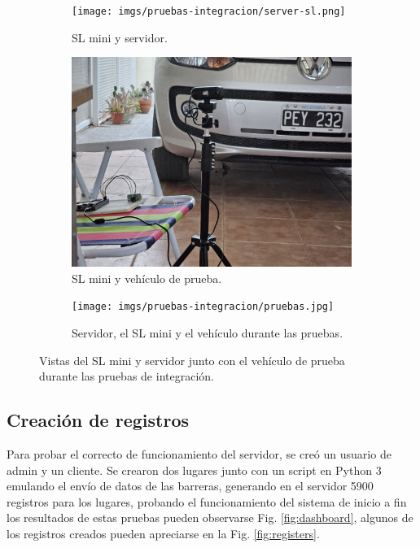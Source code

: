 \begin{figure}
    \centering
    \begin{subfigure}{.3\textwidth}
        \centering
        \texttt{[image: imgs/pruebas-integracion/server-sl.png]}
        \caption{SL mini y servidor.}
    \end{subfigure}
    \begin{subfigure}{.3\textwidth}
        \includegraphics[width=\textwidth]{imgs/pruebas-integracion/sl-auto.jpg}
        \caption{SL mini y vehículo de prueba.}
    \end{subfigure}
    \begin{subfigure}{.3\textwidth}
        \texttt{[image: imgs/pruebas-integracion/pruebas.jpg]}
        \caption{Servidor, el SL mini y el vehículo durante las pruebas.}
    \end{subfigure}

    \caption{Vistas del SL mini y servidor junto con el vehículo de prueba durante las pruebas de integración.}
    \label{fig:pruebas-integracion-sl-server}
\end{figure}


\subsection{Creación de registros}

Para probar el correcto de funcionamiento del servidor, se creó un usuario de admin y un cliente. Se crearon dos lugares junto con un script en Python 3 emulando el envío de datos de las barreras, generando en el servidor 5900 registros para los lugares, probando el funcionamiento del sistema de inicio a fin los resultados de estas pruebas pueden observarse Fig. \ref{fig:dashboard}, algunos de los registros creados pueden apreciarse en la Fig. \ref{fig:registers}.

